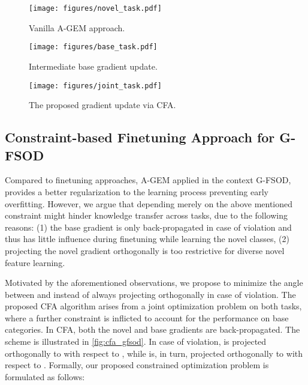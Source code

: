 \documentclass[10pt,twocolumn,letterpaper]{article}
\begin{document}
\begin{figure*}
 \centering
 \begin{subfigure}{0.3\linewidth}
    \texttt{[image: figures/novel\_task.pdf]}
    \caption{Vanilla A-GEM approach.}
    \label{fig:agem}
 \end{subfigure}
 \begin{subfigure}{0.3\linewidth}
    \texttt{[image: figures/base\_task.pdf]}
    \caption{Intermediate base gradient update.}
    \label{fig:intermediate}
 \end{subfigure}
 \begin{subfigure}{0.3\linewidth}
    \texttt{[image: figures/joint\_task.pdf]}
    \caption{The proposed gradient update via CFA.}
    \label{fig:cfa}
 \end{subfigure}
  \caption{Visualization of the gradient update for vanilla A-GEM and the proposed CFA. In \cref{fig:agem}, we present the novel task gradient update using the A-GEM where the novel task gradient is projected orthogonally to base task gradient. \cref{fig:intermediate} shows the the solution for the proposed constraint where the base task gradient is projected to a right angle with the novel task gradient. Finally, the final gradient update for the CFA algorithm is shown in \cref{fig:cfa}.}\vspace{-1em}
  \label{fig:gradients_vis}\end{figure*} 
\subsection{Constraint-based Finetuning Approach for G-FSOD}
\label{subsec:cfa}
Compared to finetuning approaches, A-GEM applied in the context G-FSOD, provides a better regularization to the learning process preventing early overfitting. However, we argue that depending merely on the above mentioned constraint might hinder knowledge transfer across tasks, due to the following reasons: (1) the base gradient is only back-propagated in case of violation and thus has little influence during finetuning while learning the novel classes, (2) projecting the novel gradient orthogonally is too restrictive for diverse novel feature learning.
 
Motivated by the aforementioned observations, we propose to minimize the angle between  and  instead of always projecting  orthogonally in case of violation. The proposed CFA algorithm arises from a joint optimization problem on both tasks, where a further constraint is inflicted to account for the performance on base categories. In CFA, both the novel and base gradients are back-propagated. The scheme is illustrated in \cref{fig:cfa_gfsod}. In case of violation,  is projected orthogonally to  with respect to , while  is, in turn, projected orthogonally to  with respect to .
Formally, our proposed constrained optimization problem is formulated as follows:
\end{document}
